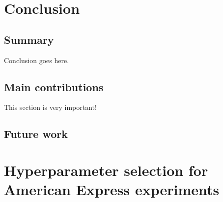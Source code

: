\documentclass{statsmsc}
\begin{document}
{%



\chapter{Conclusion} %

\section{Summary}%
\label{sec:Summary}



Conclusion goes here.




\section{Main contributions}%
\label{sec:Main contributions}

This section is very important!


\section{Future work}%
\label{sec:Future work}


\clearpage
\renewcommand*{\thepage}{A\arabic{page}}

\appendix

\chapter{Hyperparameter selection for American Express experiments}
\label{ch:hyp_amex}

}
\end{document}
